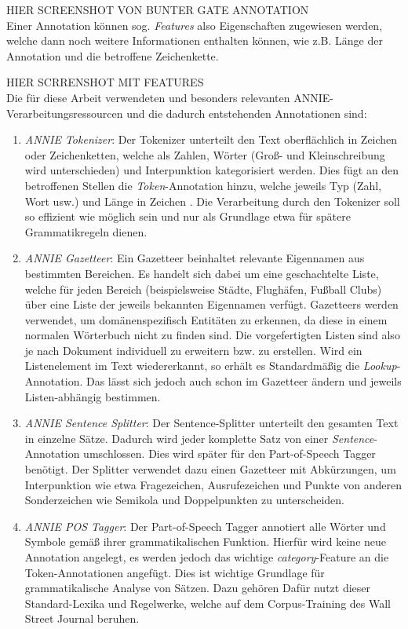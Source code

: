 \documentclass[12pt]{report}
\begin{document}
HIER SCREENSHOT VON BUNTER GATE ANNOTATION\\

Einer Annotation können sog. \textit{Features} also Eigenschaften zugewiesen werden, welche dann noch weitere Informationen enthalten können, wie z.B. Länge der Annotation und die betroffene Zeichenkette.

HIER SCRRENSHOT MIT FEATURES\\

Die für diese Arbeit verwendeten und besonders relevanten ANNIE- Verarbeitungsressourcen und die dadurch entstehenden Annotationen sind: 


\begin{enumerate}
\item \textit{ANNIE Tokenizer}: Der Tokenizer unterteilt den Text oberflächlich in Zeichen oder Zeichenketten, welche als Zahlen, Wörter (Groß- und Kleinschreibung wird unterschieden) und Interpunktion kategorisiert werden. Dies fügt an den betroffenen Stellen die \textit{Token}-Annotation hinzu, welche jeweils Typ (Zahl, Wort usw.) und Länge in Zeichen . Die Verarbeitung durch den Tokenizer soll so effizient wie möglich sein und nur als Grundlage etwa für spätere Grammatikregeln dienen.

\item \textit{ANNIE Gazetteer}: Ein Gazetteer beinhaltet relevante Eigennamen aus bestimmten Bereichen. Es handelt sich dabei um eine geschachtelte Liste, welche für jeden Bereich (beispielsweise Städte, Flughäfen, Fußball Clubs) über eine Liste der jeweils bekannten Eigennamen verfügt. Gazetteers werden verwendet, um domänenspezifisch Entitäten zu erkennen, da diese in einem normalen Wörterbuch nicht zu finden sind. Die vorgefertigten Listen sind also je nach Dokument individuell zu erweitern bzw. zu erstellen. Wird ein Listenelement im Text wiedererkannt, so erhält es Standardmäßig die \textit{Lookup}-Annotation. Das lässt sich jedoch auch schon im Gazetteer ändern und jeweils Listen-abhängig bestimmen. 

\item \textit{ANNIE Sentence Splitter}: Der Sentence-Splitter unterteilt den gesamten Text in einzelne Sätze. Dadurch wird jeder komplette Satz von einer \textit{Sentence}-Annotation umschlossen. Dies wird später für den Part-of-Speech Tagger benötigt. Der Splitter verwendet dazu einen Gazetteer mit Abkürzungen, um Interpunktion wie etwa Fragezeichen, Ausrufezeichen und Punkte von anderen Sonderzeichen wie Semikola und Doppelpunkten zu unterscheiden. 

\item \textit{ANNIE POS Tagger}: Der Part-of-Speech Tagger annotiert alle Wörter und Symbole gemäß ihrer grammatikalischen Funktion. Hierfür wird keine neue Annotation angelegt, es werden jedoch das wichtige \textit{category}-Feature an die Token-Annotationen angefügt. Dies ist wichtige Grundlage für grammatikalische Analyse von Sätzen. Dazu gehören Dafür nutzt dieser Standard-Lexika und Regelwerke, welche auf dem Corpus-Training des Wall Street Journal beruhen.
\end{enumerate}
\end{document}
